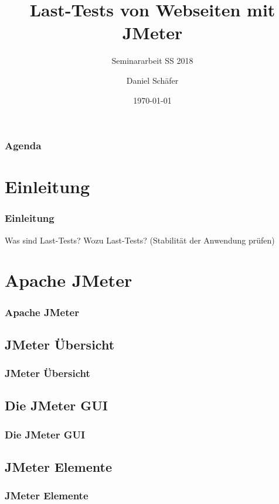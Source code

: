 \documentclass[xcolor=dvipsnames]{beamer}
\title{Last-Tests von Webseiten mit JMeter}
\subtitle{Seminararbeit SS 2018}
\author{Daniel Schäfer}
\date{\today}
\begin{document}
\begin{frame}
\titlepage
\end{frame}

\begin{frame}
\frametitle{Agenda}
		\tableofcontents
\end{frame}

\section{Einleitung}
\begin{frame}
\frametitle{Einleitung}
Was sind Last-Tests?
Wozu Last-Tests? (Stabilität der Anwendung prüfen)
\end{frame}

\section{Apache JMeter}
\begin{frame}
\frametitle{Apache JMeter}
\end{frame}


\subsection{JMeter Übersicht}
\begin{frame}
\frametitle{JMeter Übersicht}
\end{frame}

\subsection{Die JMeter GUI}
\begin{frame}
\frametitle{Die JMeter GUI}
\end{frame}

\subsection{JMeter Elemente}
\begin{frame}
\frametitle{JMeter Elemente}
\end{frame}

\end{document}
